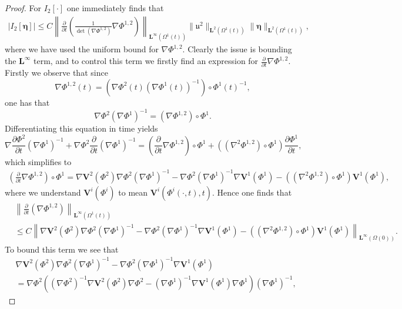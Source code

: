 \documentclass[a4paper]{amsart}
\numberwithin{equation}{section}
\newcommand{\ddt}[1]{\frac{\partial #1}{\partial t}}
\newcommand{\grad}{\nabla}
\theoremstyle{plain}
\newcommand{\mbf}[1]{\mathbf{#1}}
\newcommand{\utwo}{\boldsymbol{\mathfrak{u}}^2}
\begin{document}
\begin{proof}
       For $I_2[\cdot]$ one immediately finds that
       \begin{align*}
           \left|I_2[\boldsymbol{\eta}]\right| \leq C \left\|\ddt{}\left( \frac{1}{\det(\grad \Phi^{1,2})} \grad \Phi^{1,2}\right) \right\|_{\mbf{L}^\infty(\Omega^1(t))} \|\utwo\|_{\mbf{L}^2(\Omega^1(t))} \|\boldsymbol{\eta}\|_{\mbf{L}^2(\Omega^1(t))},
       \end{align*}
       where we have used the uniform bound for $\grad \Phi^{1,2}$.
       Clearly the issue is bounding the $\mbf{L}^\infty$ term, and to control this term we firstly find an expression for $\ddt{}\grad \Phi^{1,2}$.
       Firstly we observe that since
       \[\grad \Phi^{1,2}(t) = \left(\grad \Phi^2(t)(\grad \Phi^1(t))^{-1} \right) \circ \Phi^1(t)^{-1},\]
        one has that
       \[  \grad \Phi^2 (\grad \Phi^1)^{-1} = (\grad\Phi^{1,2}) \circ \Phi^1. \]
       Differentiating this equation in time yields
       \[ \grad \ddt{\Phi^2} (\grad \Phi^1)^{-1} + \grad \Phi^2 \ddt{}\left( \grad \Phi^1 \right)^{-1}  = \left(\ddt{} \grad \Phi^{1,2}\right)\circ \Phi^1 + ((\grad^2 \Phi^{1,2}) \circ \Phi^1) \ddt{\Phi^1}, \]
       which simplifies to
       \begin{align*}
           \left(\ddt{} \grad \Phi^{1,2}\right)\circ \Phi^1 = \grad \mbf{V}^2(\Phi^2) \grad \Phi^2 (\grad \Phi^1)^{-1} -  \grad \Phi^2 (\grad \Phi^1)^{-1} \grad \mbf{V}^1(\Phi^1) - ((\grad^2 \Phi^{1,2}) \circ \Phi^1) \mbf{V}^1(\Phi^1),
       \end{align*}
       where we understand $\mbf{V}^i(\Phi^i)$ to mean $\mbf{V}^i(\Phi^i(\cdot,t),t)$.
       Hence one finds that 
       \begin{align*}
           &\left\|\ddt{} (\grad \Phi^{1,2}) \right\|_{\mbf{L}^\infty(\Omega^1(t))}\\
           &\leq C \left\|\grad \mbf{V}^2(\Phi^2) \grad \Phi^2 (\grad \Phi^1)^{-1} -  \grad \Phi^2 (\grad \Phi^1)^{-1} \grad \mbf{V}^1(\Phi^1) - ((\grad^2 \Phi^{1,2}) \circ \Phi^1) \mbf{V}^1(\Phi^1)\right\|_{\mbf{L}^\infty(\Omega(0))}.
       \end{align*}
       To bound this term we see that
       \begin{align*}
           &\grad \mbf{V}^2(\Phi^2) \grad \Phi^2 (\grad \Phi^1)^{-1} -  \grad \Phi^2 (\grad \Phi^1)^{-1} \grad \mbf{V}^1(\Phi^1)\\
           &= \grad \Phi^2 \left( (\grad \Phi^2)^{-1} \grad \mbf{V}^2(\Phi^2) \grad \Phi^2 - (\grad \Phi^1)^{-1} \grad \mbf{V}^1(\Phi^1) \grad \Phi^1\right) (\grad \Phi^1)^{-1},
       \end{align*}

\end{proof}
\end{document}
